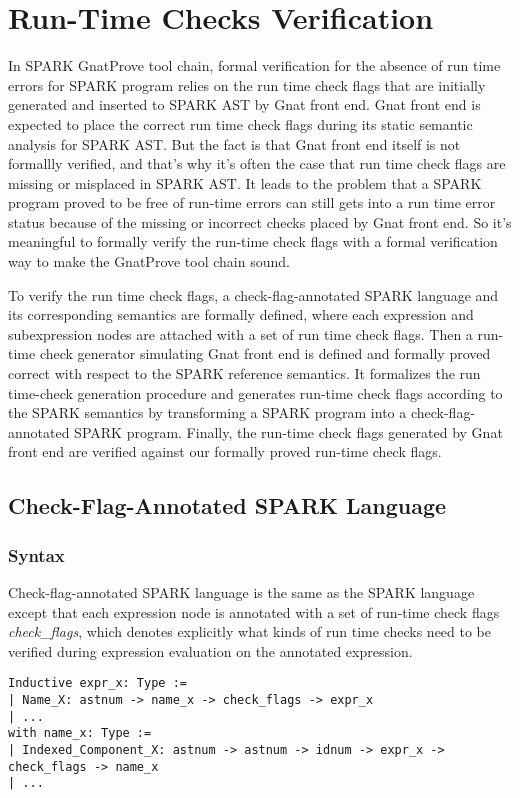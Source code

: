 \section{Run-Time Checks Verification}
In SPARK GnatProve tool chain, formal verification for the absence of run time
errors for SPARK program relies on the run time check flags that are initially
generated and inserted to SPARK AST by Gnat front end. Gnat front end is
expected to place the correct run time check flags during its static semantic
analysis for SPARK AST. But the fact is that Gnat front end itself is not formallly verified,
and that's why it's often the case that run time check flags are missing or
misplaced in SPARK AST. It leads to the problem that a SPARK program proved to
be free of run-time errors can still gets into a run time error status because
of the missing or incorrect checks placed by Gnat front end. So it's meaningful
to formally verify the run-time check flags with a formal verification way to
make the GnatProve tool chain sound.

To verify the run time check flags, a check-flag-annotated SPARK language
and its corresponding semantics are formally defined, where each expression and
subexpression nodes are attached with a set of run time check flags. Then a
run-time check generator simulating Gnat front end is defined and formally
proved correct with respect to the SPARK reference semantics. It formalizes the
run time-check generation procedure and generates run-time check flags according
to the SPARK semantics by transforming a SPARK program into a
check-flag-annotated SPARK program. Finally, the run-time check flags
generated by Gnat front end are verified against our formally
proved run-time check flags.

\subsection{Check-Flag-Annotated SPARK Language}
\subsubsection{Syntax}
Check-flag-annotated SPARK language is the same as the SPARK language except
that each expression node is annotated with a set of run-time check flags
\textit{check\_flags}, which denotes explicitly what kinds of run time checks
need to be verified during expression evaluation on the annotated expression.

\begin{lstlisting}[escapechar=\#, language=coq, basicstyle=\scriptsize]
Inductive expr_x: Type :=  
| Name_X: astnum -> name_x -> check_flags -> expr_x 
| ...
with name_x: Type := 
| Indexed_Component_X: astnum -> astnum -> idnum -> expr_x -> check_flags -> name_x 
| ...
\end{lstlisting}

